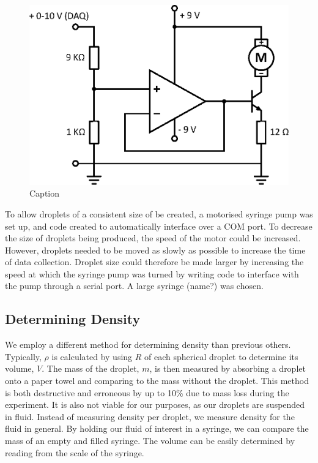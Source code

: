 \documentclass{physics_article_B}
\begin{document}
            \begin{figure}[H]
                \centering
                \hspace*{-1.8cm}\includegraphics[scale=0.8]{Figures/MotorCircuit.eps}
                \caption{Caption}
                \label{fig:MotorCircuit}
            \end{figure}
        
        To allow droplets of a consistent size of be created, a motorised syringe pump was set up, and code created to automatically interface over a COM port. To decrease the size of droplets being produced, the speed of the motor could be increased. However, droplets needed to be moved as slowly as possible to increase the time of data collection. Droplet size could therefore be made larger by increasing the speed at which the syringe pump was turned by writing code to interface with the pump through a serial port. A large syringe (name?) was chosen.
        
        
    \subsection{Determining Density\label{sect:method:density}}
    
        We employ a different method for determining density than previous others. Typically, $\rho$ is calculated by using $R$ of each spherical droplet to determine its volume, $V$. The mass of the droplet, $m$, is then measured by absorbing a droplet onto a paper towel and comparing to the mass without the droplet\cite{hill}. This method is both destructive and erroneous by up to 10\%\cite{harrold2} due to mass loss during the experiment. It is also not viable for our purposes, as our droplets are suspended in fluid. 
        Instead of measuring density per droplet, we measure density for the fluid in general. By holding our fluid of interest in a syringe, we can compare the mass of an empty and filled syringe. The volume can be easily determined by reading from the scale of the syringe.
    
\end{document}
